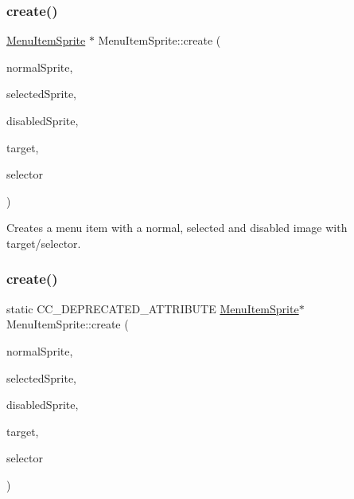 \subsubsection{\texorpdfstring{create()}{create()}\hspace{0.1cm}{\footnotesize\ttfamily [5/10]}}
{\footnotesize\ttfamily \hyperlink{classMenuItemSprite}{Menu\+Item\+Sprite} $\ast$ Menu\+Item\+Sprite\+::create (\begin{DoxyParamCaption}\item[{\hyperlink{classNode}{Node} $\ast$}]{normal\+Sprite,  }\item[{\hyperlink{classNode}{Node} $\ast$}]{selected\+Sprite,  }\item[{\hyperlink{classNode}{Node} $\ast$}]{disabled\+Sprite,  }\item[{\hyperlink{classRef}{Ref} $\ast$}]{target,  }\item[{S\+E\+L\+\_\+\+Menu\+Handler}]{selector }\end{DoxyParamCaption})\hspace{0.3cm}{\ttfamily [static]}}

Creates a menu item with a normal, selected and disabled image with target/selector. \mbox{\label{classMenuItemSprite_abceba9cbe4ceca1114943a78f35991ba}} 
\subsubsection{\texorpdfstring{create()}{create()}\hspace{0.1cm}{\footnotesize\ttfamily [6/10]}}
{\footnotesize\ttfamily static C\+C\+\_\+\+D\+E\+P\+R\+E\+C\+A\+T\+E\+D\+\_\+\+A\+T\+T\+R\+I\+B\+U\+TE \hyperlink{classMenuItemSprite}{Menu\+Item\+Sprite}$\ast$ Menu\+Item\+Sprite\+::create (\begin{DoxyParamCaption}\item[{\hyperlink{classNode}{Node} $\ast$}]{normal\+Sprite,  }\item[{\hyperlink{classNode}{Node} $\ast$}]{selected\+Sprite,  }\item[{\hyperlink{classNode}{Node} $\ast$}]{disabled\+Sprite,  }\item[{\hyperlink{classRef}{Ref} $\ast$}]{target,  }\item[{S\+E\+L\+\_\+\+Menu\+Handler}]{selector }\end{DoxyParamCaption})\hspace{0.3cm}{\ttfamily [static]}}

